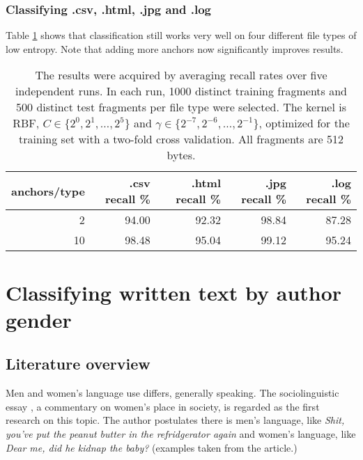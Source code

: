 \subsubsection{Classifying .csv, .html, .jpg and .log}

Table \ref{table:csv_html_jpg_log_recall} shows that classification still
works very well on four different file types of low entropy. Note that
adding more anchors now significantly improves results.


\begin{table}[h]
\begin{tabular}{rrrrr}
\hline
   anchors/type &   .csv recall \% &   .html recall \% &   .jpg recall \% &   .log recall \% \\
\hline
              2 &           94.00    &            92.32 &           98.84 &           87.28 \\
             10 &           98.48 &            95.04 &           99.12 &           95.24 \\
\hline
\end{tabular}
\caption{
The results were acquired by averaging recall rates over five
independent runs. In each run, 1000 distinct training fragments and 500
distinct test fragments per file type were selected. The kernel is RBF, $C
\in \{ 2^{0}, 2^{1}, \dots, 2^{5} \}$ and $\gamma \in \{2^{-7}, 2^{-6},
\dots, 2^{-1} \}$, optimized for the training set with a two-fold cross
validation. All fragments are 512 bytes.}
\label{table:csv_html_jpg_log_recall}
\end{table}



\section{Classifying written text by author gender} 

\subsection{Literature overview}

Men and women's language use differs, generally speaking. The
sociolinguistic essay \cite{Lakoff1973}, a commentary on women's place in
society, is regarded as the first research on this topic. The author
postulates there is men's language, like \emph{Shit, you've put the peanut
butter in the refridgerator again} and women's language, like \emph{Dear
me, did he kidnap the baby?} (examples taken from the article.)

